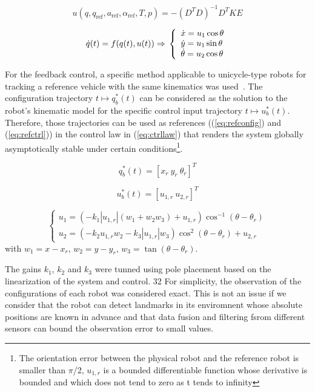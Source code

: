 \documentclass[letterpaper, 10 pt, conference]{ieeeconf}  %
\begin{document}
\[
u(q, q_{\text{ref}}, a_{\text{ref}}, \alpha_{\text{ref}}, T, p) = -(D^TD)^{-1}D^TKE
\]

\begin{equation}
\dot{q}(t) = f(q(t), u(t)) \Rightarrow\\
\left\lbrace\begin{array}{lcl}
\dot{x} = u_1\cos\theta\\
\dot{y} = u_1\sin\theta\\
\dot{\theta} = u_2\cos\theta
\end{array}\right.
\end{equation}

For the feedback control, a specific method applicable to unicycle-type robots for tracking a reference vehicle with the same kinematics was used~\cite{siciliano2008springer}. The configuration trajectory $t \longmapsto q_b^*(t)$ can be considered as the solution to the robot's kinematic model for the specific control input trajectory $t \longmapsto u_b^*(t)$. Therefore, those trajectories can be used as references ((\ref{eq:refconfig}) and (\ref{eq:refctrl})) in the control law in (\ref{eq:ctrllaw}) that renders the system globally asymptotically stable under certain conditions\footnote{The orientation error between the physical robot and the reference robot is smaller than $\pi$/2, $u_{1,r}$ is a bounded differentiable function whose derivative is bounded and which does not tend to zero as t tends to infinity}.

\begin{equation}\label{eq:refconfig}
q_b^*(t) = [x_r\ y_r\ \theta_r]^T
\end{equation}

\begin{equation}\label{eq:refctrl}
u_b^*(t) = [u_{1,r}\ u_{2,r}]^T
\end{equation}

\begin{equation}\label{eq:ctrllaw}
\left\lbrace\begin{array}{lcl}
u_1 = (-k_1|u_{1,r}|(w_1 + w_2w_3) + u_{1,r})\cos^{-1}(\theta-\theta_r)\\
u_2 = (-k_2u_{1,r}w_2 - k_3|u_{1,r}|w_3)\cos^2(\theta-\theta_r) + u_{2,r}
\end{array}\right.
\end{equation}
with $w_1 = x - x_r$, $w_2 = y - y_r$, $w_3 = \tan(\theta - \theta_r)$.

The gains $k_1$, $k_2$ and $k_3$ were tunned using pole placement based on the linearization of the system and control.
32
For simplicity, the observation of the configurations of each robot was considered exact. This is not an issue if we consider that the robot can detect landmarks in its enviromnent whose absolute positions are known in advance and that data fusion and filtering fsrom different sensors can bound the observation error to small values.
\end{document}
